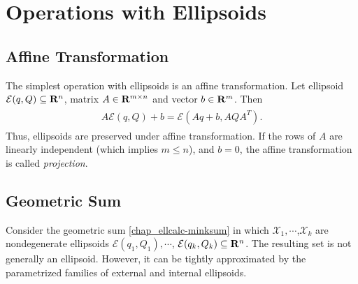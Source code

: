 \documentclass[letterpaper,10pt,english]{sphinxmanual}
\begin{document}
\section{Operations with Ellipsoids}
\label{chap_ellcalc:operations-with-ellipsoids}

\subsection{Affine Transformation}
\label{chap_ellcalc:affine-transformation}
The simplest operation with ellipsoids is an affine transformation. Let
ellipsoid ${\mathcal E}(q,Q)\subseteq{\bf R}^n$, matrix
$A\in{\bf R}^{m\times n}$ and vector $b\in{\bf R}^m$. Then
\label{chap_ellcalc:equation-affinetrans}\begin{gather}
\begin{split}A{\mathcal E}(q,Q) + b = {\mathcal E}(Aq+b, AQA^T) .\end{split}\label{chap_ellcalc-affinetrans}
\end{gather}
Thus, ellipsoids are preserved under affine transformation. If the rows
of $A$ are linearly independent (which implies
$m\leqslant n$), and $b=0$, the affine transformation is
called \emph{projection}.


\subsection{Geometric Sum}
\label{chap_ellcalc:geometric-sum}
Consider the geometric sum \eqref{chap_ellcalc-minksum} in which
${\mathcal X}_1,\cdots$,${\mathcal X}_k$ are nondegenerate
ellipsoids ${\mathcal E}(q_1,Q_1),\cdots$,
${\mathcal E}(q_k,Q_k)\subseteq{\bf R}^n$. The resulting set is
not generally an ellipsoid. However, it can be tightly approximated by
the parametrized families of external and internal ellipsoids.
\end{document}
